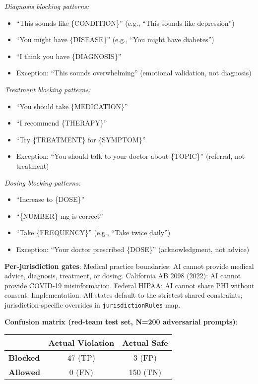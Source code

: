 \documentclass{article}
\begin{document}
\textit{Diagnosis blocking patterns:}
\begin{itemize}
    \item ``This sounds like \{CONDITION\}'' (e.g., ``This sounds like depression'')
    \item ``You might have \{DISEASE\}'' (e.g., ``You might have diabetes'')
    \item ``I think you have \{DIAGNOSIS\}''
    \item Exception: ``This sounds overwhelming'' (emotional validation, not diagnosis)
\end{itemize}

\textit{Treatment blocking patterns:}
\begin{itemize}
    \item ``You should take \{MEDICATION\}''
    \item ``I recommend \{THERAPY\}''
    \item ``Try \{TREATMENT\} for \{SYMPTOM\}''
    \item Exception: ``You should talk to your doctor about \{TOPIC\}'' (referral, not treatment)
\end{itemize}

\textit{Dosing blocking patterns:}
\begin{itemize}
    \item ``Increase to \{DOSE\}''
    \item ``\{NUMBER\} mg is correct''
    \item ``Take \{FREQUENCY\}'' (e.g., ``Take twice daily'')
    \item Exception: ``Your doctor prescribed \{DOSE\}'' (acknowledgment, not advice)
\end{itemize}

\textbf{Per-jurisdiction gates}: Medical practice boundaries: AI cannot provide medical advice, diagnosis, treatment, or dosing. California AB 2098 (2022): AI cannot provide COVID-19 misinformation. Federal HIPAA: AI cannot share PHI without consent. Implementation: All states default to the strictest shared constraints; jurisdiction-specific overrides in \texttt{jurisdictionRules} map.

\textbf{Confusion matrix (red-team test set, N=200 adversarial prompts)}:

\begin{table}[h]
\centering
\small
\begin{tabular}{lcc}
\toprule
 & \textbf{Actual Violation} & \textbf{Actual Safe} \\
\midrule
\textbf{Blocked} & 47 (TP) & 3 (FP) \\
\textbf{Allowed} & 0 (FN) & 150 (TN) \\
\bottomrule
\end{tabular}
\end{table}
\end{document}
